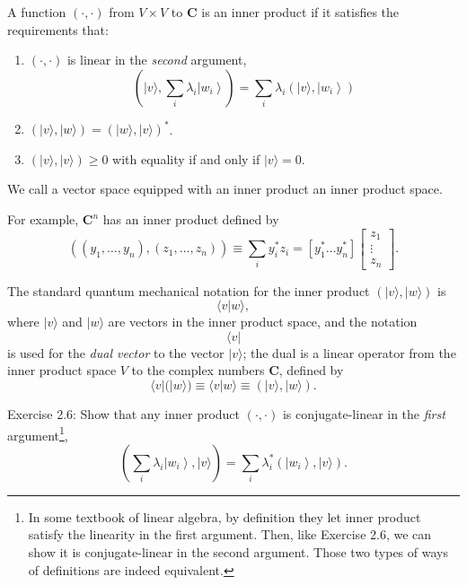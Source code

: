 


A function $(\cdot, \cdot)$ from $V \times V$ to $\mathbf{C}$ is an inner product if it satisfies the requirements that:
\begin{enumerate}
    \item $(\cdot, \cdot)$ is linear in the \textit{second} argument, 
$$
\left(|v\rangle, \sum_{i} \lambda_{i}\left|w_{i}\right\rangle\right)=\sum_{i} \lambda_{i}\left(|v\rangle,\left|w_{i}\right\rangle\right)
$$
    \item $(|v\rangle,|w\rangle)=(|w\rangle,|v\rangle)^{*}$.
    \item $(|v\rangle,|v\rangle) \geq 0$ with equality if and only if $|v\rangle=0$.
\end{enumerate}
We call a vector space equipped with an inner product an inner product space.

\begin{example}
    For example, $\mathbf{C}^{n}$ has an inner product defined by
$$
\left(\left(y_{1}, \ldots, y_{n}\right),\left(z_{1}, \ldots, z_{n}\right)\right) \equiv \sum_{i} y_{i}^{*} z_{i}=\left[y_{1}^{*} \ldots y_{n}^{*}\right]\left[\begin{array}{c}
z_{1} \\
\vdots \\
z_{n}
\end{array}\right].
$$
\end{example}

The standard quantum mechanical notation for the inner product $(|v\rangle,|w\rangle)$ is $$\langle v | w\rangle,$$where $|v\rangle$ and $|w\rangle$ are vectors in the inner product space, and the notation 
$$
\langle v|
$$
is used for the \textit{dual vector} to the vector $|v\rangle$; the dual is a linear operator from the inner product space $V$ to the complex numbers $\mathbf{C}$, defined by
$$
\langle v|(|w\rangle) \equiv\langle v | w\rangle \equiv(|v\rangle,|w\rangle).
$$


\begin{exercise}
    Exercise 2.6: Show that any inner product $(\cdot, \cdot)$ is conjugate-linear in the \textit{first} argument\footnote{In some textbook of linear algebra, by definition they let inner product satisfy the linearity in the first argument. Then, like Exercise 2.6, we can show it is conjugate-linear in the second argument. Those two types of ways of definitions are indeed equivalent. },
$$
\left(\sum_{i} \lambda_{i}\left|w_{i}\right\rangle,|v\rangle\right)=\sum_{i} \lambda_{i}^{*}\left(\left|w_{i}\right\rangle,|v\rangle\right) .
$$
\end{exercise}

